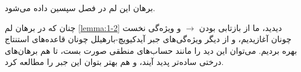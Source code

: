 برهان این لم در فصل سپسین داده می‌شود.
\par
چنان که در برهان لم 
\ref{lemma:1-2}
دیدید، ما از بازتابی بودن 
$\rightarrow$
و ویژه‌گی نخست
چونان  آغازیدیم، و از دیگر ویژه‌گی‌های جبر آیدکیویچ-بارهیلل چونان قاعده‌های استنتاج بهره بردیم.
می‌توان این دید را مانند حساب‌های منطقی صورت بست، تا هم برهان‌های درختی ساده‌تر پدید آیند، و هم بهتر بتوان این جبر را مطالعه کرد.